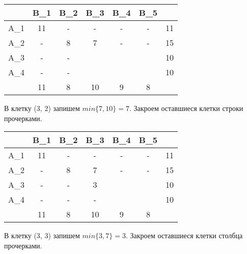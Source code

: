 \documentclass{article}
\begin{document}
\begin{table}[H]
    \centering
    \begin{tabular}{|c|c|c|c|c|c| |c|}
    \hline
        &\cellcolor{myGren} B_1 & \cellcolor{myGren}B_2 & \cellcolor{myGren}B_3 & \cellcolor{myGren}B_4 & \cellcolor{myGren} B_5 &  \\ \hline
       \cellcolor{myGren} A_1 &  11 & - &- & - & - & 11\\ \hline
       \cellcolor{myGren} A_2 & - & 8 & \cellcolor{Gray}7 & \cellcolor{Gray}- & \cellcolor{Gray}- & \cellcolor{Gray}15\\  \hline
       \cellcolor{myGren} A_3 & - & - & \cellcolor{Gray}  &  &  & 10\\ \hline
       \cellcolor{myGren} A_4 & - & - & \cellcolor{Gray} &  &  & 10\\ \hline \hline
            & 11 &  8 & \cellcolor{Gray}10 & 9 & 8 & \\
        \hline
    \end{tabular}
    \label{tab:my_label}
\end{table}

\noindent В клетку (3, 2) запишем $min\{7, 10\} = 7$. Закроем оставшиеся клетки строки прочерками.

\begin{table}[H]
    \centering
    \begin{tabular}{|c|c|c|c|c|c| |c|}
    \hline
        &\cellcolor{myGren} B_1 & \cellcolor{myGren}B_2 & \cellcolor{myGren}B_3 & \cellcolor{myGren}B_4 & \cellcolor{myGren} B_5 &  \\ \hline
       \cellcolor{myGren} A_1 &  11 & - &- & - & - & 11\\ \hline
       \cellcolor{myGren} A_2 & - & 8 & 7 & - & - & 15\\  \hline
       \cellcolor{myGren} A_3 & - & - & \cellcolor{Gray}3 & \cellcolor{Gray} &\cellcolor{Gray}  & \cellcolor{Gray}10\\ \hline
       \cellcolor{myGren} A_4 & - & - & \cellcolor{Gray}- &  &  & 10\\ \hline \hline
            & 11 &  8 & \cellcolor{Gray}10 & 9 & 8 & \\
        \hline
    \end{tabular}
    \label{tab:my_label}
\end{table}

\noindent В клетку (3, 3) запишем $min\{3, 7\} = 3$. Закроем оставшиеся клетки столбца прочерками.
\end{document}
